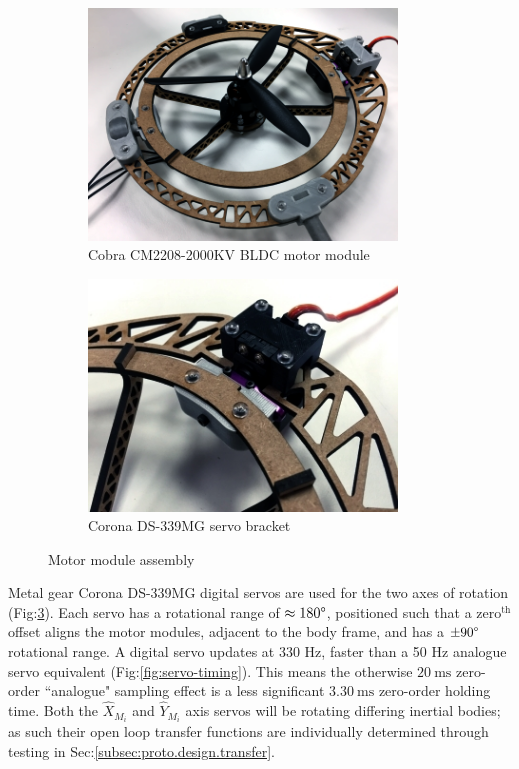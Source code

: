 \begin{figure}[htbp]
\centering
\begin{subfigure}{0.49\textwidth}
\centering
\includegraphics[width=0.9\textwidth]{figs/motor-bldc}
\caption{Cobra CM2208-2000KV BLDC motor module}
\label{fig:bldc-motor}
\end{subfigure}
\begin{subfigure}{0.49\textwidth}
\centering
\includegraphics[width=0.9\textwidth]{figs/motor-servo}
\caption{Corona DS-339MG servo bracket}
\label{fig:motor-servo}
\end{subfigure}
\vspace{-5pt}
\caption{Motor module assembly}
\vspace{-15pt}
\end{figure}
\par
Metal gear Corona DS-339MG digital servos are used for the two axes of rotation (Fig:\ref{fig:motor-servo}). Each servo has a rotational range of $\approx 180\text{\textdegree}$, positioned such that a $\text{zero}^{\text{th}}$ offset aligns the motor modules, adjacent to the body frame, and has a $\pm 90\text{\textdegree}$ rotational range. A digital servo updates at 330 Hz, faster than a 50 Hz analogue servo equivalent (Fig:\ref{fig:servo-timing}). This means the otherwise $20~\text{ms}$ zero-order ``analogue" sampling effect is a less significant $3.30~\text{ms}$ zero-order holding time. Both the $\hat{X}_{M_i}$ and $\hat{Y}_{M_i}$ axis servos will be rotating differing inertial bodies; as such their open loop transfer functions are individually determined through testing in Sec:\ref{subsec:proto.design.transfer}.
